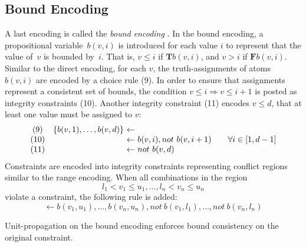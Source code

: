 \documentclass{tlp}
\newcommand{\tass}[1]{\mathbf{T}#1}
\newcommand{\fass}[1]{\mathbf{F}#1}
\newcommand{\dneg}{not\ }
\begin{document}
\subsection{Bound Encoding}

A last encoding is called the \emph{bound encoding} \cite{crba94a}. In the bound encoding, a propositional variable~$b(v, i)$ is introduced for each value $i$ to represent that the value of~$v$ is bounded by~$i$. That is, $v \leq i$ if $\tass{b(v,i)}$, and $v > i$ if $\fass{b(v,i)}$. Similar to the direct encoding, for each $v$, the truth-assignments of atoms~$b(v, i)$ are encoded by a choice rule (9). In order to ensure that assignments represent a consistent set of bounds, the condition $v \leq i \Rightarrow v \leq i+1$ is posted as integrity constraints (10). Another integrity constraint (11) encodes $v \leq d$, that at least one value must be assigned to $v$:
\[
\begin{array}{cr@{\ \leftarrow\ }l}
(9) & \{ b(v, 1), \dots, b(v, d) \} & \\
(10) & &  b(v, i), \dneg b(v, i+1)\qquad \forall i \in \lbrack 1, d-1 \rbrack \\
(11)& & \dneg b(v, d)
\end{array}
\]
Constraints are encoded into integrity constraints representing conflict regions similar to the range encoding. When all combinations in the region
\[
l_1 < v_1 \leq u_1, \dots, l_n < v_n \leq u_n
\]
violate a constraint, the following rule is added:
\[
\leftarrow b(v_1, u_1), \dots, b(v_n, u_n), \dneg b(v_1, l_1), \dots, \dneg b(v_n, l_n)
\]
\begin{theorem} \label{thm:bnd}
Unit-propagation on the bound encoding enforces bound consistency on the original constraint.
\end{theorem}
\end{document}
